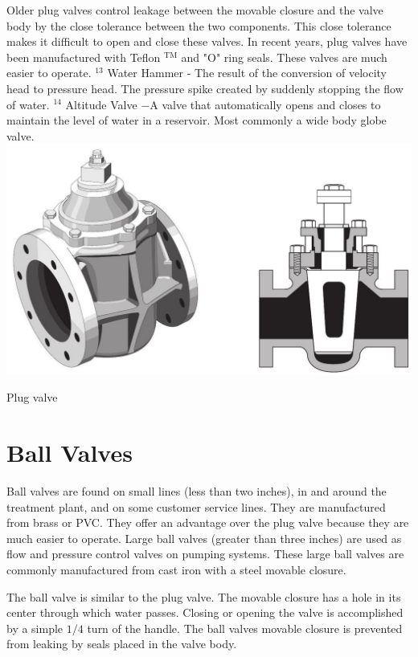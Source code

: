 \documentclass[10pt]{article}
\begin{document}
Older plug valves control leakage between the movable closure and the valve body by the close tolerance between the two components. This close tolerance makes it difficult to open and close these valves. In recent years, plug valves have been manufactured with Teflon ${ }^{\mathrm{TM}}$ and "O" ring seals. These valves are much easier to operate. ${ }^{13}$ Water Hammer - The result of the conversion of velocity head to pressure head. The pressure spike created by suddenly stopping the flow of water. ${ }^{14}$ Altitude Valve $-\mathrm{A}$ valve that automatically opens and closes to maintain the level of water in a reservoir. Most commonly a wide body globe valve.\\

\includegraphics[max width=\textwidth]{PlugValve2}

Plug valve

\section{Ball Valves}
Ball valves are found on small lines (less than two inches), in and around the treatment plant, and on some customer service lines. They are manufactured from brass or PVC. They offer an advantage over the plug valve because they are much easier to operate. Large ball valves (greater than three inches) are used as flow and pressure control valves on pumping systems. These large ball valves are commonly manufactured from cast iron with a steel movable closure.

The ball valve is similar to the plug valve. The movable closure has a hole in its center through which water passes. Closing or opening the valve is accomplished by a simple $1 / 4$ turn of the handle. The ball valves movable closure is prevented from leaking by seals placed in the valve body.\\
\end{document}

